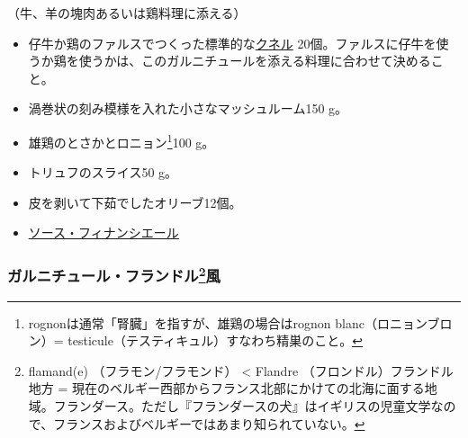 \begin{recette}

（牛、羊の塊肉あるいは鶏料理に添える）

\begin{itemize}
\item
  仔牛か鶏のファルスでつくった標準的な\protect\hyperlink{quenelles-diverses}{クネル}
  20個。ファルスに仔牛を使うか鶏を使うかは、このガルニチュールを添える料理に合わせて決めること。
\item
  渦巻状の刻み模様を入れた小さなマッシュルーム150 g。
\item
  雄鶏のとさかとロニョン\footnote{rognonは通常「腎臓」を指すが、雄鶏の場合はrognon
    blanc（ロニョンブロン）=
    testicule（テスティキュル）すなわち精巣のこと。}100 g。
\item
  トリュフのスライス50 g。
\item
  皮を剥いて下茹でしたオリーブ12個。
\item
  \protect\hyperlink{sauce-financiere}{ソース・フィナンシエール}
\end{itemize}

\atoaki{}

\hypertarget{garniture-flamande}{%
\subsubsection[ガルニチュール・フランドル風]{\texorpdfstring{ガルニチュール・フランドル\footnote{flamand(e)
  （フラモン/フラモンド） \textless{} Flandre
  （フロンドル）フランドル地方 =
  現在のベルギー西部からフランス北部にかけての北海に面する地域。フランダース。ただし『フランダースの犬』はイギリスの児童文学なので、フランスおよびベルギーではあまり知られていない。}風}{ガルニチュール・フランドル風}}\label{garniture-flamande}}




\end{recette}
